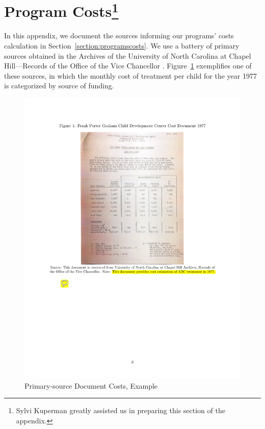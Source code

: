 \section[Program Costs of ABC/CARE]{Program Costs\footnote{Sylvi Kuperman greatly assisted us in preparing this section of the appendix.}} \label{app:programcosts}

\noindent In this appendix, we document the sources informing our programs' costs calculation in Section~\ref{section:programscosts}. We use a battery of primary sources obtained in the Archives of the University of North Carolina at Chapel Hill---Records of the Office of the Vice Chancellor \citet{UNC-Archives_Health-Affairs}. Figure~\ref{figure:who} exemplifies one of these sources, in which the monthly cost of treatment per child for the year 1977 is categorized by source of funding.

\begin{center}
\begin{figure}[H] 
\caption{Primary-source Document Costs, Example}
\label{figure:who}
\centering
\includegraphics[width=.9\columnwidth]{AppOutput/Program/UNC-costs.pdf}
\end{figure}
\end{center}

